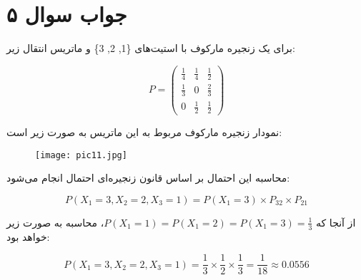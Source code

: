 \section*{جواب سوال ۵}

برای یک زنجیره مارکوف با استیت‌های \{1, 2, 3\} و ماتریس انتقال زیر:

\[
P = \begin{pmatrix}
	\frac{1}{4} & \frac{1}{4} & \frac{1}{2} \\
	\frac{1}{3} & 0 & \frac{2}{3} \\
	0 & \frac{1}{2} & \frac{1}{2}
\end{pmatrix}
\]

نمودار زنجیره مارکوف مربوط به این ماتریس به صورت زیر است:

\begin{figure}[H]
	\centering
	\texttt{[image: pic11.jpg]}
	\label{fig:label4}
\end{figure}

محاسبه این احتمال بر اساس قانون زنجیره‌ای احتمال انجام می‌شود:

\[
P(X_1 = 3, X_2 = 2, X_3 = 1) = P(X_1 = 3) \times P_{32} \times P_{21}
\]

از آنجا که \(P(X_1 = 1) = P(X_1 = 2) = P(X_1 = 3) = \frac{1}{3}\)، محاسبه به صورت زیر خواهد بود:

\[
P(X_1 = 3, X_2 = 2, X_3 = 1) = \frac{1}{3} \times \frac{1}{2} \times \frac{1}{3} = \frac{1}{18} \approx 0.0556
\]